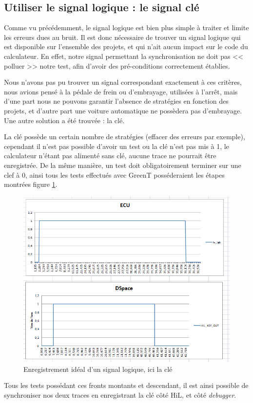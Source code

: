 \subsection{Utiliser le signal logique : le signal clé}
Comme vu précédemment, le signal logique est bien plus simple à traiter et limite les erreurs dues au bruit. Il est donc nécessaire de trouver un signal logique qui est disponible sur l'ensemble des projets, et qui n'ait aucun impact sur le code du calculateur. En effet, notre signal permettant la synchronisation ne doit pas << polluer >> notre test, afin d'avoir des pré-conditions correctement établies. 

Nous n'avons pas pu trouver un signal correspondant exactement à ces critères, nous avions pensé à la pédale de frein ou d'embrayage, utilisées à l'arrêt, mais d'une part nous ne pouvons garantir l'absence de stratégies en fonction des projets, et d'autre part une voiture automatique ne possèdera pas d'embrayage. Une autre solution a été trouvée : la clé.

La clé possède un certain nombre de stratégies (effacer des erreurs par exemple), cependant il n'est pas possible d'avoir un test ou la clé n'est pas mis à 1, le calculateur n'étant pas alimenté sans clé, aucune trace ne pourrait être enregistrée. De la même manière, un test doit obligatoirement terminer sur une clef à 0, ainsi tous les tests effectués avec GreenT posséderaient les étapes montrées figure \ref{fig:testKey}. 

\begin{figure}[h]
	\centering
	\includegraphics[width=0.61\linewidth]{contents/images/sync2}
	\caption{Enregistrement idéal d'un signal logique, ici la clé}
	\label{fig:testKey}
\end{figure}


Tous les tests possédant ces fronts montants et descendant, il est ainsi possible de synchroniser nos deux traces en enregistrant la clé côté HiL, et côté \textit{debugger}. 

